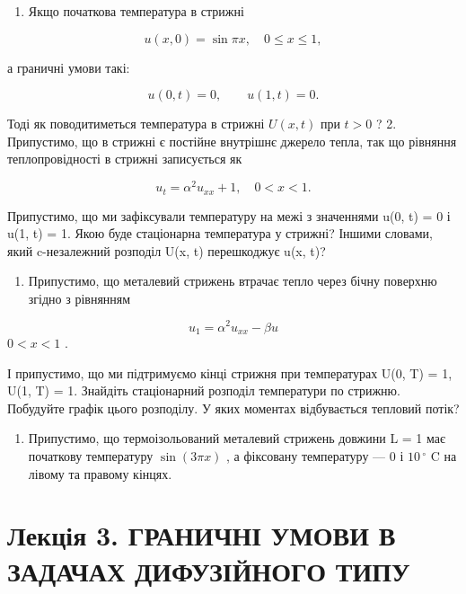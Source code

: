 \begin{enumerate}
\def\labelenumi{\arabic{enumi}.}
\tightlist
\item
  Якщо початкова температура в стрижні
\end{enumerate}

\[u(x, 0) = \sin \pi x, \quad 0 \leqslant x \leqslant 1,\]

а граничні умови такі:

\[
u(0, t) = 0, \qquad u(1, t) = 0.
\]

Тоді як поводитиметься температура в стрижні \(U(x, t)\) при \(t > 0\) ? 2. Припустимо, що в стрижні є постійне внутрішнє джерело тепла, так що рівняння теплопровідності в стрижні записується як

\[u_t = \alpha^2 u_{xx} + 1, \quad 0 < x < 1.\]

Припустимо, що ми зафіксували температуру на межі з значеннями u(0, t) = 0 і u(1, t) = 1. Якою буде стаціонарна температура у стрижні? Іншими словами, який c-незалежний розподіл U(x, t) перешкоджує u(x, t)?

\begin{enumerate}
\def\labelenumi{\arabic{enumi}.}
\setcounter{enumi}{2}
\tightlist
\item
  Припустимо, що металевий стрижень втрачає тепло через бічну поверхню згідно з рівнянням
\end{enumerate}

\[u_1 = \alpha^2 u_{xx} - \beta u\] \(0 < x < 1\) .

І припустимо, що ми підтримуємо кінці стрижня при температурах U(0, T) = 1, U(1, T) = 1. Знайдіть стаціонарний розподіл температури по стрижню. Побудуйте графік цього розподілу. У яких моментах відбувається тепловий потік?

\begin{enumerate}
\def\labelenumi{\arabic{enumi}.}
\setcounter{enumi}{3}
\tightlist
\item
  Припустимо, що термоізольований металевий стрижень довжини L = 1 має початкову температуру \(\sin(3\pi x)\) , а фіксовану температуру --- 0 і \(10\,^{\circ}\) C на лівому та правому кінцях.
\end{enumerate}

\section{Лекція 3. ГРАНИЧНІ УМОВИ В ЗАДАЧАХ ДИФУЗІЙНОГО ТИПУ}\label{ux43bux435ux43aux446ux456ux44f-3.-ux433ux440ux430ux43dux438ux447ux43dux456-ux443ux43cux43eux432ux438-ux432-ux437ux430ux434ux430ux447ux430ux445-ux434ux438ux444ux443ux437ux456ux439ux43dux43eux433ux43e-ux442ux438ux43fux443}

